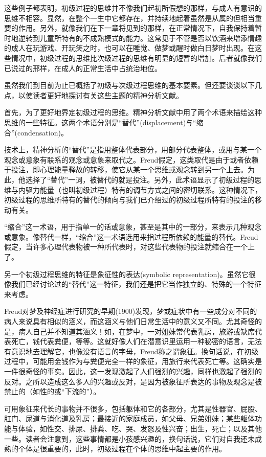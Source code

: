 \documentclass[UTF8,10pt,a4paper,openany]{book}
\begin{document}
这些例子都表明，初级过程的思维并不像我们起初所假想的那样，与成人有意识的思维不相容。显然，在整个一生中它都存在，并持续地起着虽然是从属的但相当重要的作用。另外，就像我们在下一章将见到的那样，在正常情况下，自我保持着暂时地逆转到儿童所特有的不成熟模式的能力。这常见于不管是否以饮酒来增添情趣的成人在玩游戏、开玩笑之时，也可以在睡觉、做梦或醒时做白日梦时出现。在这些情况中，初级过程的思维比次级过程的思维有明显的短暂的增加。后者就像我们已说过的邢样，在成人的正常生活中占统治地位。

虽然我们到目前为止已概括了初级与次级过程思维的基本要素。但还要谈谈以下几点，以使读者更好地探讨有关这些主题的精神分析文献。

首先，为了更好地界定初级过程的思维。精神分析文献中用了两个术语来描绘这种思维的一些特征。这两个术语分别是“替代”(displacement)与“缩合”(condensation)。

技术上，精神分析的“替代”是指用整体代表部分，用部分代表整体，或用与某一个观念或意象有联系的观念或意象来取代之。Freud假定，这类取代是由于或者依赖于投注，即心理能量释故的转移，使它从某一个思维或观念转到另一个上去。为此，他选择了“替代”一词，被替代的就是投注。另外，此术语显示了初级过程的思维与内驱力能量（也叫初级过程）特有的调节方式之间的密切联系。这种情况下，初级过程的思维所特有的替代的倾向与我们已介绍过的初级过程所特有的投注的移动有关。

“缩合”这一术语，用于指单一的话或意象，甚至是其中的一部分，来表示几种观念或意象。像替代一样，“缩合”这一术语选用来指过程所依赖的能量的替代。Freud假定，当许多心理代表物被一种所代表时，对这些代表物的投注就缩合在一个上了。

另一个初级过程思维的特征是象征性的表达(symbolic representation)。虽然它很像我们已经讨论过的“替代”这一特征，我们还是把它当作独立的、特殊的一个特征来考虑。

Freud对梦及神经症进行研究的早期(1900)发现，梦或症状中有一些成分对不同的病人来说具有相似的涵义，而这涵义与他们日常生活中的意义又不同。尤其奇怪的是，病人自己并不知道其涵义！如，在梦中，一对姐妹常代表乳房，旅游或缺席代表死亡，钱代表粪便，等等。这就好像人们在潜意识里运用一种秘密的语言，无法有意识地去理解它，也像没有语言的字母，Freud称之谓象征。换句话说，在初级过程中，可能用金钱作为与粪便完全一样的象征，用旅行来代表死亡等。这确实是一件很奇怪的事实。因此，这一发现激起了人们强烈的兴趣，同样也激起了强烈的反对。之所以造成这么多人的兴趣或反对，是因为被象征所表达的事物及观念是被禁止的（如性的或“下流的”）。

可用象征来代长的事物并不很多，包括躯体和它的各部分，尤其是性器官、屁股、肛门、尿道与消化道及乳房；最接近的家庭成员，如父母、兄弟姐妹；某些躯体功能与体验，如性交、排尿、排粪、吃、哭、发怒及性兴奋；出生，死亡；以及其他一些。读者会注意到，这些事情都是小孩感兴趣的，换句话说，它们对自我还未成熟的个体是很重要的，此时，初级过程在个体的思维中起主要的作用。
\end{document}
